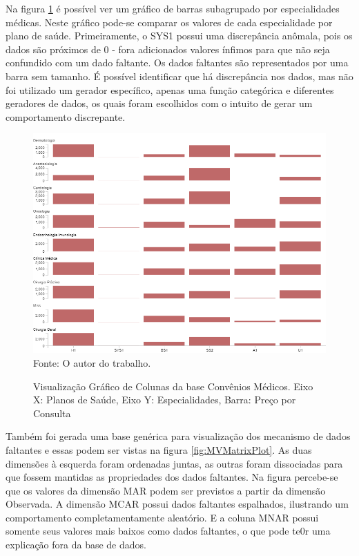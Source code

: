 \documentclass[
	12pt,				%
	openright,			%
	oneside,			%
	a4paper,			%
	english,			%
	brazil				%
	]{abntex2}
\begin{document}

	Na figura \ref{fig:BCCM} é possível ver um gráfico de barras subagrupado por especialidades médicas.
	Neste gráfico pode-se comparar os valores de cada especialidade por plano de saúde.
	Primeiramente, o SYS1 possui uma discrepância anômala, pois os dados são próximos de 0 - fora adicionados valores ínfimos para que não seja confundido com um dado faltante.
	Os dados faltantes são representados por uma barra sem tamanho.
	É possível identificar que há discrepância nos dados, mas não foi utilizado um gerador específico, apenas uma função categórica e diferentes geradores de dados, os quais foram escolhidos com o intuito de gerar um comportamento discrepante.

	\begin{figure}[h!]
		\centering
		\caption{Visualização Gráfico de Colunas da base Convênios Médicos. Eixo X: Planos de Saúde, Eixo Y: Especialidades, Barra: Preço por Consulta}
		\includegraphics[width=\linewidth]{./figures/Resultados/BCCM.png}
		\label{fig:BCCM}
		\footnotesize Fonte: O autor do trabalho.
	\end{figure}

	Também foi gerada uma base genérica para visualização dos mecanismo de dados faltantes e essas podem ser vistas na figura \ref{fig:MVMatrixPlot}.
	As duas dimensões à esquerda foram ordenadas juntas, as outras foram dissociadas para que fossem mantidas as propriedades dos dados faltantes.
	Na figura percebe-se que os valores da dimensão MAR podem ser previstos a partir da dimensão Observada.
	A dimensão MCAR possui dados faltantes espalhados, ilustrando um comportamento completamentamente aleatório.
	E a coluna MNAR possui somente seus valores mais baixos como dados faltantes, o que pode te0r uma explicação fora da base de dados.
	
\end{document}
